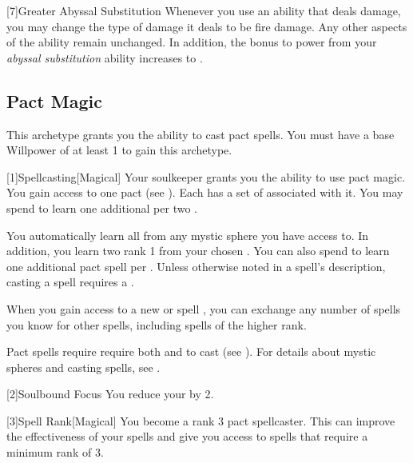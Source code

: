         [7]{Greater Abyssal Substitution} Whenever you use an ability that deals damage, you may change the type of damage it deals to be fire damage.
        Any other aspects of the ability remain unchanged.
        In addition, the bonus to power from your \textit{abyssal substitution} ability increases to .

    \subsection{Pact Magic}
        This archetype grants you the ability to cast pact spells.
        You must have a base Willpower of at least 1 to gain this archetype.

        [1]{Spellcasting}[Magical]
        Your soulkeeper grants you the ability to use pact magic.
        You gain access to one pact  (see ).
        Each  has a set of  associated with it.
        You may spend  to learn one additional  per two .

        You automatically learn all  from any mystic sphere you have access to.
        In addition, you learn two rank 1  from your chosen .
        You can also spend  to learn one additional pact spell per .
        Unless otherwise noted in a spell's description, casting a spell requires a .

        When you gain access to a new  or spell ,
            you can exchange any number of spells you know for other spells,
            including spells of the higher rank.

        Pact spells require require both  and  to cast (see ).
        For details about mystic spheres and casting spells, see .

        [2]{Soulbound Focus} You reduce your  by 2.

        [3]{Spell Rank}[Magical] You become a rank 3 pact spellcaster.
        This can improve the effectiveness of your spells and give you access to spells that require a minimum rank of 3.

